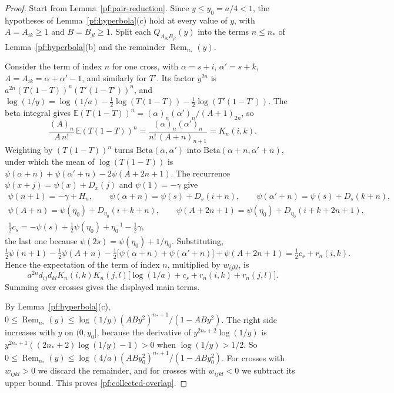 \begin{proof}
Start from Lemma~\ref{pf:pair-reduction}. Since $y\le y_0=a/4<1$, the
hypotheses of Lemma~\ref{pf:hyperbola}(c) hold at every value of $y$,
with $A=A_{ik}\ge1$ and $B=B_{jl}\ge1$. Split each
$Q_{A_{ik}B_{jl}}(y)$ into the terms $n\le n_*$ of
Lemma~\ref{pf:hyperbola}(b) and the remainder $\operatorname{Rem}_{n_*}(y)$.

Consider the term of index $n$ for one cross, with $\alpha=s+i$,
$\alpha'=s+k$, $A=A_{ik}=\alpha+\alpha'-1$, and similarly for $T'$. Its
factor $y^{2n}$ is $a^{2n}(T(1-T))^n(T'(1-T'))^n$, and
$\log(1/y)=\log(1/a)-\frac12\log(T(1-T))-\frac12\log(T'(1-T'))$. The
beta integral gives $\mathbb E(T(1-T))^n=(\alpha)_n(\alpha')_n/(A+1)_{2n}$,
so
\[
 \frac{(A)_n}{A\,n!}\,\mathbb E(T(1-T))^n
 =\frac{(\alpha)_n(\alpha')_n}{n!\,(A+n)_{n+1}}=K_n(i,k).
\]
Weighting by $(T(1-T))^n$ turns $\mathrm{Beta}(\alpha,\alpha')$ into
$\mathrm{Beta}(\alpha+n,\alpha'+n)$, under which the mean of
$\log(T(1-T))$ is $\psi(\alpha+n)+\psi(\alpha'+n)-2\psi(A+2n+1)$. The
recurrence $\psi(x+j)=\psi(x)+D_x(j)$ and $\psi(1)=-\gamma$ give
\[
 \begin{gathered}
 \psi(n+1)=-\gamma+H_n,\qquad
 \psi(\alpha+n)=\psi(s)+D_s(i+n),\qquad
 \psi(\alpha'+n)=\psi(s)+D_s(k+n),\\
 \psi(A+n)=\psi(\eta_0)+D_{\eta_0}(i+k+n),\qquad
 \psi(A+2n+1)=\psi(\eta_0)+D_{\eta_0}(i+k+2n+1),\\
 \tfrac12c_s=-\psi(s)+\tfrac12\psi(\eta_0)+\eta_0^{-1}-\tfrac12\gamma,
 \end{gathered}
\]
the last one because $\psi(2s)=\psi(\eta_0)+1/\eta_0$. Substituting,
\[
 \tfrac12\psi(n+1)-\tfrac12\psi(A+n)
 -\tfrac12\bigl[\psi(\alpha+n)+\psi(\alpha'+n)\bigr]+\psi(A+2n+1)
 =\tfrac12c_s+r_n(i,k).
\]
Hence the expectation of the term of index $n$, multiplied by
$w_{ijkl}$, is
\[
 a^{2n}d_{ij}d_{kl}K_n(i,k)K_n(j,l)\bigl[\log(1/a)+c_s+r_n(i,k)
 +r_n(j,l)\bigr].
\]
Summing over crosses gives the displayed main terms.

By Lemma~\ref{pf:hyperbola}(c),
$0\le\operatorname{Rem}_{n_*}(y)\le\log(1/y)(ABy^2)^{n_*+1}/(1-ABy^2)$. The right
side increases with $y$ on $(0,y_0]$, because the derivative of
$y^{2n_*+2}\log(1/y)$ is $y^{2n_*+1}((2n_*+2)\log(1/y)-1)>0$ when
$\log(1/y)>1/2$. So
$0\le\operatorname{Rem}_{n_*}(y)\le\log(4/a)(ABy_0^2)^{n_*+1}/(1-ABy_0^2)$. For
crosses with $w_{ijkl}>0$ we discard the remainder, and for crosses
with $w_{ijkl}<0$ we subtract its upper bound. This proves
\eqref{pf:collected-overlap}.
\end{proof}

